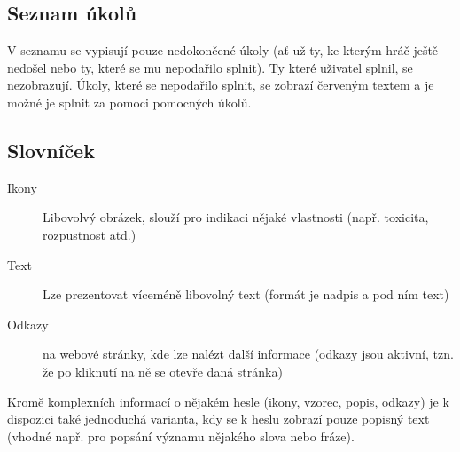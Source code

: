 \documentclass[a4paper,12pt]{article}
\begin{document}
\subsection{Seznam úkolů}
V seznamu se vypisují pouze nedokončené úkoly (ať už ty, ke kterým hráč ještě nedošel nebo ty, které se mu nepodařilo splnit). Ty které uživatel splnil, se nezobrazují. Úkoly, které se nepodařilo splnit, se zobrazí červeným textem a je možné je splnit za pomoci pomocných úkolů.
\begin{figure}[H]
\end{figure}
\subsection{Slovníček}
\begin{description}
\item[Ikony] Libovolvý obrázek, slouží pro indikaci nějaké vlastnosti (např. toxicita, rozpustnost atd.)
\item[Text] Lze prezentovat víceméně libovolný text (formát je nadpis a pod ním text)
\item[Odkazy] na webové stránky, kde lze nalézt další informace (odkazy jsou aktivní, tzn. že po kliknutí na ně se otevře daná stránka)
\end{description}
\begin{figure}[H]
\end{figure}
Kromě komplexních informací o nějakém hesle (ikony, vzorec, popis, odkazy) je k dispozici také jednoduchá varianta, kdy se k heslu zobrazí pouze popisný text (vhodné např. pro popsání významu nějakého slova nebo fráze).
\newpage
\end{document}

